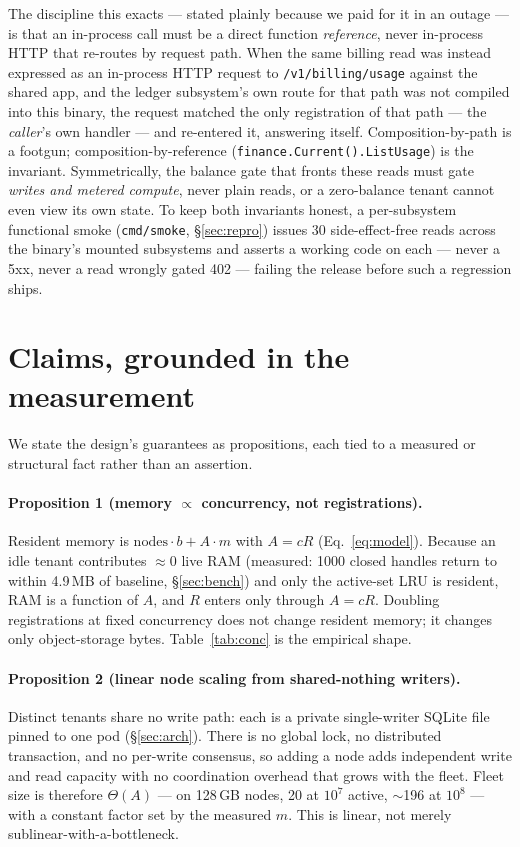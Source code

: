 \documentclass[11pt]{article}
\begin{document}
The discipline this exacts --- stated plainly because we paid for it in an outage --- is that an
in-process call must be a direct function \emph{reference}, never in-process HTTP that re-routes
by request path. When the same billing read was instead expressed as an in-process HTTP request
to \texttt{/v1/billing/usage} against the shared app, and the ledger subsystem's own route for
that path was not compiled into this binary, the request matched the only registration of that
path --- the \emph{caller}'s own handler --- and re-entered it, answering itself.
Composition-by-path is a footgun; composition-by-reference (\texttt{finance.Current().ListUsage})
is the invariant. Symmetrically, the balance gate that fronts these reads must gate \emph{writes
and metered compute}, never plain reads, or a zero-balance tenant cannot even view its own state.
To keep both invariants honest, a per-subsystem functional smoke (\texttt{cmd/smoke},
\S\ref{sec:repro}) issues 30 side-effect-free reads across the binary's mounted subsystems and
asserts a working code on each --- never a 5xx, never a read wrongly gated 402 ---
failing the release before such a regression ships.

\section{Claims, grounded in the measurement}
\label{sec:claims}
We state the design's guarantees as propositions, each tied to a measured or structural fact
rather than an assertion.

\paragraph{Proposition 1 (memory $\propto$ concurrency, not registrations).}
Resident memory is $\text{nodes}\cdot b + A\cdot m$ with $A = cR$ (Eq.~\ref{eq:model}). Because
an idle tenant contributes $\approx$0 live RAM (measured: 1000 closed handles return to within
4.9\,MB of baseline, \S\ref{sec:bench}) and only the active-set LRU is resident, RAM is a
function of $A$, and $R$ enters only through $A = cR$. Doubling registrations at fixed
concurrency does not change resident memory; it changes only object-storage bytes.
Table~\ref{tab:conc} is the empirical shape.

\paragraph{Proposition 2 (linear node scaling from shared-nothing writers).}
Distinct tenants share no write path: each is a private single-writer SQLite file pinned to one
pod (\S\ref{sec:arch}). There is no global lock, no distributed transaction, and no per-write
consensus, so adding a node adds independent write and read capacity with no coordination
overhead that grows with the fleet. Fleet size is therefore $\Theta(A)$ --- on 128\,GB nodes,
20 at $10^7$ active, $\sim$196 at $10^8$ --- with a constant factor set by the measured $m$. This
is linear, not merely sublinear-with-a-bottleneck.
\end{document}

